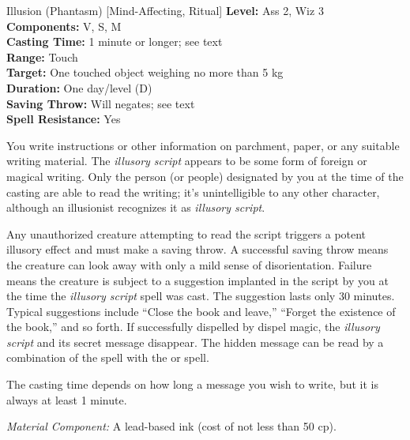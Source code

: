 {Illusion (Phantasm) [Mind-Affecting, Ritual]}
{
	\textbf{Level:}
	Ass 2, Wiz 3\\
	\textbf{Components:}
	V, S, M\\
	\textbf{Casting Time:}
	1 minute or longer; see text\\
	\textbf{Range:}
	Touch\\
	\textbf{Target:}
	One touched object weighing no more than 5 kg\\
	\textbf{Duration:}
	One day/level (D)\\
	\textbf{Saving Throw:}
	Will negates; see text\\
	\textbf{Spell Resistance:}
	Yes\\
}
{
	You write instructions or other information on parchment, paper, or any suitable writing material. The \emph{illusory script} appears to be some form of foreign or magical writing. Only the person (or people) designated by you at the time of the casting are able to read the writing; it's unintelligible to any other character, although an illusionist recognizes it as \emph{illusory script}.

	Any unauthorized creature attempting to read the script triggers a potent illusory effect and must make a saving throw. A successful saving throw means the creature can look away with only a mild sense of disorientation. Failure means the creature is subject to a suggestion implanted in the script by you at the time the \emph{illusory script} spell was cast. The suggestion lasts only 30 minutes. Typical suggestions include ``Close the book and leave,'' ``Forget the existence of the book,'' and so forth. If successfully dispelled by dispel magic, the \emph{illusory script} and its secret message disappear. The hidden message can be read by a combination of the  spell with the  or  spell.

	The casting time depends on how long a message you wish to write, but it is always at least 1 minute.

	\textit{Material Component:}
	A lead-based ink (cost of not less than 50 cp).

}
